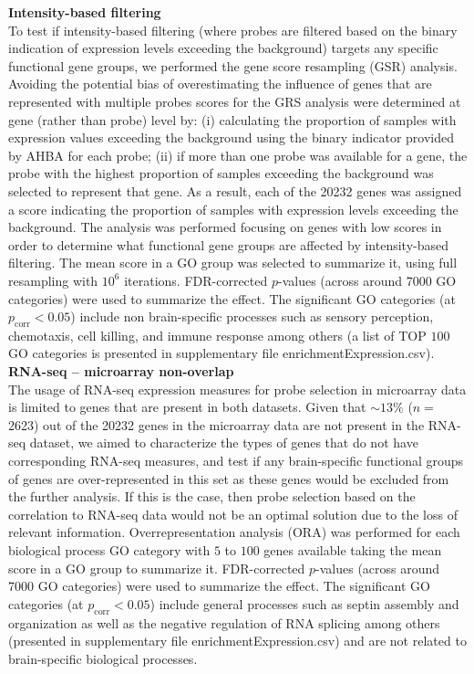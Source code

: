 \textbf{Intensity-based filtering}\\
To test if intensity-based filtering (where probes are filtered based on the binary indication of expression levels exceeding the background) targets any specific functional gene groups, we performed the gene score resampling (GSR) analysis. Avoiding the potential bias of overestimating the influence of genes that are represented with multiple probes scores for the GRS analysis were determined at gene (rather than probe) level by: (i) calculating the proportion of samples with expression values exceeding the background using the binary indicator provided by AHBA for each probe; (ii) if more than one probe was available for a gene, the probe with the highest proportion of samples exceeding the background was selected to represent that gene. As a result, each of the \num{20232} genes was assigned a score indicating the proportion of samples with expression levels exceeding the background. The analysis was performed focusing on genes with low scores in order to determine what functional gene groups are affected by intensity-based filtering. The mean score in a GO group was selected to summarize it, using full resampling with $10^{6}$ iterations. FDR-corrected $p$-values (across around \num{7000} GO categories) were used to summarize the effect. The significant GO categories (at $p_\mathrm{corr}<0.05$) include non brain-specific processes such as sensory perception, chemotaxis, cell killing, and immune response among others (a list of TOP $100$ GO categories is presented in supplementary file enrichmentExpression.csv). \\

\textbf{RNA-seq – microarray non-overlap}\\
The usage of RNA-seq expression measures for probe selection in microarray data is limited to genes that are present in both datasets. Given that $\sim13\%$ ($n=$\num{2623}) out of the  \num{20232} genes in the microarray data are not present in the RNA-seq dataset, we aimed to characterize the types of genes that do not have corresponding RNA-seq measures, and test if any brain-specific functional groups of genes are over-represented in this set as these genes would be excluded from the further analysis. If this is the case, then probe selection based on the correlation to RNA-seq data would not be an optimal solution due to the loss of relevant information. Overrepresentation analysis (ORA) was performed for each biological process GO category with $5$ to $100$ genes available taking the mean score in a GO group to summarize it. FDR-corrected $p$-values (across around \num{7000} GO categories) were used to summarize the effect. The significant GO categories (at $p_\mathrm{corr}<0.05$) include general processes such as septin assembly and organization as well as the negative regulation of RNA splicing among others (presented in supplementary file enrichmentExpression.csv) and are not related to brain-specific biological processes. \\

